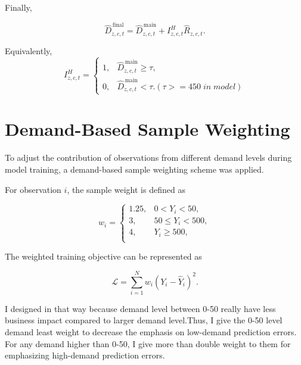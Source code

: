 \documentclass{article}
\begin{document}
Finally,

\begin{equation}
\widehat{D}_{z,c,t}^{\,\mathrm{final}}
=
\widehat{D}_{z,c,t}^{\,\mathrm{main}}
+
I_{z,c,t}^{H}\widehat{R}_{z,c,t}.
\end{equation}

Equivalently,
\begin{equation}
I_{z,c,t}^{H}
=
\begin{cases}
1, &
\widehat{D}_{z,c,t}^{\,\mathrm{main}} \geq \tau,\\
0, &
\widehat{D}_{z,c,t}^{\,\mathrm{main}} < \tau.(\tau>=450\;in\; model)
\end{cases}
\end{equation}

\section{Demand-Based Sample Weighting}

To adjust the contribution of observations from different demand
levels during model training, a demand-based sample weighting scheme
was applied.

For observation $i$, the sample weight is defined as

\[
w_i =
\begin{cases}
1.25, & 0 < Y_i < 50, \\[4pt]
3, & 50 \leq Y_i < 500, \\[4pt]
4, & Y_i \geq 500, \\[4pt]
\end{cases}
\]

The weighted training objective can be represented as

\[
\mathcal{L}
=
\sum_{i=1}^{N}
w_i
\left(
Y_i-\widehat{Y}_i
\right)^2.
\]

I designed in that way because demand level between 0-50 really have
less business impact compared to larger demand level.Thus, I give the
0-50 level demand least weight to decrease the emphasis on low-demand
prediction errors. For any demand higher than 0-50, I give more than double
weight to them for emphasizing high-demand prediction errors.
\end{document}
